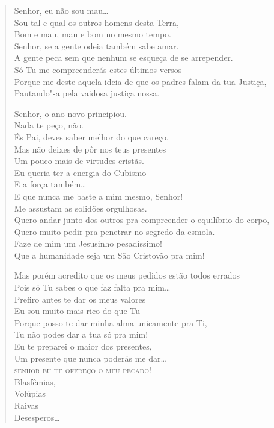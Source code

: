 \begin{verse}
Senhor, eu não sou mau\ldots{}\\
Sou tal e qual os outros homens desta Terra,\\
Bom e mau, mau e bom no mesmo tempo.\\
Senhor, se a gente odeia também sabe amar.\\
A gente peca sem que nenhum se esqueça de se arrepender.\\
Só Tu me compreenderás estes últimos versos\\
Porque me deste aquela ideia de que os padres falam da tua Justiça,\\
Pautando"-a pela vaidosa justiça nossa.

Senhor, o ano novo principiou.\\
Nada te peço, não.\\
És Pai, deves saber melhor do que careço.\\
Mas não deixes de pôr nos teus presentes\\
Um pouco mais de virtudes cristãs.\\
Eu queria ter a energia do Cubismo\\
E a força também\ldots{}\\
E que nunca me baste a mim mesmo, Senhor!\\
Me assustam as solidões orgulhosas.\\
Quero andar junto dos outros pra compreender o equilíbrio do corpo,\\
Quero muito pedir pra penetrar no segredo da esmola.\\
Faze de mim um Jesusinho pesadíssimo!\\
Que a humanidade seja um São Cristovão pra mim!

Mas porém acredito que os meus pedidos estão todos errados\\
Pois só Tu sabes o que faz falta pra mim\ldots{}\\
Prefiro antes te dar os meus valores\\
Eu sou muito mais rico do que Tu\\
Porque posso te dar minha alma unicamente pra Ti,\\
Tu não podes dar a tua só pra mim!\\
Eu te preparei o maior dos presentes,\\
Um presente que nunca poderás me dar\ldots{}\\
\textsc{senhor eu te ofereço o meu pecado!}\\
\qquad\qquad\qquad\qquad\qquad\qquad Blasfêmias,\\
\qquad\qquad\qquad\qquad\qquad\qquad Volúpias\\
\qquad\qquad\qquad\qquad\qquad\qquad Raivas\\
\qquad\qquad\qquad\qquad\qquad\qquad Desesperos\ldots{}


\end{verse}
